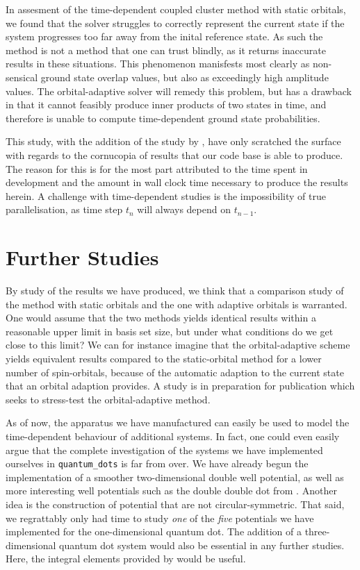 In assesment of the time-dependent coupled cluster method with static orbitals,
we found that the solver struggles to correctly represent the current state if 
the system progresses too far away from the inital reference state. As such the 
method is not a method that one can trust blindly, as it returns
inaccurate results in these situations. This phenomenon manisfests most clearly as 
non-sensical ground state overlap values, but also as exceedingly high amplitude 
values. The orbital-adaptive solver will remedy this problem, but has a drawback 
in that it cannot feasibly produce inner products of two states in time, and therefore 
is unable to compute time-dependent ground state probabilities.

This study, with the addition of the study by \citeauthor{islandwind2019}\cite{islandwind2019},
have only scratched the surface with regards to the cornucopia of results that our 
code base is able to produce. The reason for this is for the most part attributed to 
the time spent in development and the amount in wall clock time necessary to 
produce the results herein. A challenge with time-dependent studies is the 
impossibility of true parallelisation, as time step $t_n$ will always depend 
on $t_{n-1}$.

\section{Further Studies}

By study of the results we have produced, we think that a comparison study 
of the method with static orbitals and the one with adaptive orbitals is warranted.
One would assume that the two methods yields identical results within a reasonable 
upper limit in basis set size, but under what conditions do we get close to this
limit? We can for instance imagine that the orbital-adaptive scheme yields equivalent
results compared to the static-orbital method for a lower number of spin-orbitals,
because of the automatic adaption to the current state that an orbital adaption 
provides. A study is in preparation for publication which seeks to stress-test
the orbital-adaptive method\cite{islandwind2019numerically}.

As of now, the apparatus we have manufactured can easily be used to model 
the time-dependent behaviour of additional systems. In fact, one could even 
easily argue that the complete investigation of the systems we have implemented 
ourselves in \lstinline{quantum_dots} is far from over. We have already begun
the implementation of a smoother two-dimensional double well potential, as well as 
more interesting well potentials such as the double double dot 
from \citeauthor{nielsen2012configuration}\cite{nielsen2012configuration}. Another 
idea is the construction of potential that are not circular-symmetric.
That said, we regrattably only had time to study \emph{one} of the
\emph{five} potentials we have implemented for the one-dimensional quantum dot.
The addition of a three-dimensional quantum dot system would also be essential 
in any further studies. Here, the integral elements provided by
\citeauthor{vorrath2003electronic}\cite{vorrath2003electronic} would be useful.

